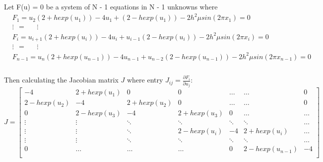 \documentclass[fleqn]{report}
\begin{document}
Let F(u) = 0 be a system of N - 1 equations in N - 1 unknowns where
\begin{equation}
\begin{split}
&F_1 = u_{2}(2 + hexp(u_1)) - 4u_1 + (2 - hexp(u_1)) - 2h^2\mu sin(2 \pi x_1) = 0  \\
&\vdots \ \ = \ \ \ \ \ \ \                   \vdots\\
&F_i =  u_{i+1}(2 + hexp(u_i)) - 4u_i + u_{i-1}(2 - hexp(u_i)) - 2h^2\mu sin(2 \pi x_i) = 0  \\
&\vdots \ \ = \ \ \ \ \ \ \                   \vdots\\
    &F_{n-1} =  u_{n}(2 + hexp(u_{n-1})) - 4u_{n-1} + u_{n-2}(2 - hexp(u_{n-1})) - 2h^2\mu sin(2 \pi x_{n-1}) = 0 \\
    \end{split}
\end{equation}
\\
Then calculating the Jacobian matrix $J$ where entry $J_{ij} = \frac{\partial F_i}{\partial u_j}$:
\[
 J=
\left[ {\begin{array}{ccccccc}
-4 & 2 +hexp(u_1) & 0 & 0 & \hdots & \hdots & 0 \\
2 - hexp(u_2) & -4 & 2 + hexp(u_2) & 0 & \hdots & \hdots & 0 \\ 
0 & 2 - hexp(u_3) & -4 & 2 + hexp(u_3) & 0 & \hdots & \hdots \\
\vdots & \vdots & \ddots & \ddots & \ddots & \ddots & \hdots \\
\vdots & \vdots & \ddots & 2 - hexp(u_i) & -4  & 2 + hexp(u_i) & \hdots \\
\vdots & \vdots & \ddots & \ddots & \ddots & \ddots & \hdots \\
0 & \hdots & \hdots & \hdots & 0 & 2 - hexp(u_{n-1}) & -4  \\
  \end{array} } \right]
\]
\end{document}

